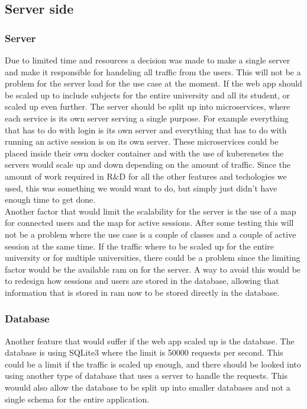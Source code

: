 \subsection{Server side}
\subsubsection{Server}
Due to limited time and resources a decision was made to make a single server and make it responsible for handeling all traffic from the users. This will not be a problem for the server load for the use case at the moment. If the web app should be scaled up to include subjects for the entire university and all its student, or scaled up even further. The server should be split up into microservices, where each service is its own server serving a single purpose. For example everything that has to do with login is its own server and everything that has to do with running an active session is on its own server. These microservices could be placed inside their own docker container and with the use of kuberenetes the servers would scale up and down depending on the amount of traffic. Since the amount of work required in R\&D for all the other features and techologies we used, this was something we would want to do, but simply just didn't have enough time to get done.
\\[11pt]
Another factor that would limit the scalability for the server is the use of a map for connected users and the map for active sessions. After some testing this will not be a problem where the use case is a couple of classes and a couple of active session at the same time. If the traffic where to be scaled up for the entire university or for multiple universities, there could be a problem since the limiting factor would be the available ram on for the server. A way to avoid this would be to redesign how sessions and users are stored in the database, allowing that information that is stored in ram now to be stored directly in the database. 
\subsubsection{Database}
Another feature that would suffer if the web app scaled up is the database. The database is using SQLite3 where the limit is 50000 requests per second\cite{SQLite:faqQ19}. This could be a limit if the traffic is scaled up enough, and there should be looked into using another type of database that uses a server to handle the requests. This wouuld also allow the database to be split up into smaller databases and not a single schema for the entire application.